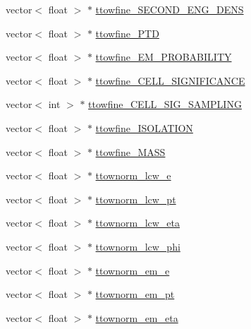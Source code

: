 \begin{DoxyCompactItemize}
\item 
vector$<$ float $>$ $\ast$ \hyperlink{classJetAnalysisExample_ad11605eb068b178cce5c252ad570e131}{ttowfine\+\_\+\+S\+E\+C\+O\+N\+D\+\_\+\+E\+N\+G\+\_\+\+D\+E\+NS}
\item 
vector$<$ float $>$ $\ast$ \hyperlink{classJetAnalysisExample_a8370b79382f319fb16996e94d5d34678}{ttowfine\+\_\+\+P\+TD}
\item 
vector$<$ float $>$ $\ast$ \hyperlink{classJetAnalysisExample_a1db849870dd2c5ee9dbfed083eca334d}{ttowfine\+\_\+\+E\+M\+\_\+\+P\+R\+O\+B\+A\+B\+I\+L\+I\+TY}
\item 
vector$<$ float $>$ $\ast$ \hyperlink{classJetAnalysisExample_ac0b410f6f014e66b5d1b8fde13ca35ad}{ttowfine\+\_\+\+C\+E\+L\+L\+\_\+\+S\+I\+G\+N\+I\+F\+I\+C\+A\+N\+CE}
\item 
vector$<$ int $>$ $\ast$ \hyperlink{classJetAnalysisExample_a26a2e5df09b8b98306636b9b274c9e2f}{ttowfine\+\_\+\+C\+E\+L\+L\+\_\+\+S\+I\+G\+\_\+\+S\+A\+M\+P\+L\+I\+NG}
\item 
vector$<$ float $>$ $\ast$ \hyperlink{classJetAnalysisExample_a0b42178d780176d3aa5cad512428ecc9}{ttowfine\+\_\+\+I\+S\+O\+L\+A\+T\+I\+ON}
\item 
vector$<$ float $>$ $\ast$ \hyperlink{classJetAnalysisExample_adad5fc34d91b35607bbfb822e727947d}{ttowfine\+\_\+\+M\+A\+SS}
\item 
vector$<$ float $>$ $\ast$ \hyperlink{classJetAnalysisExample_adc41a1a50c58b33ff3c35ec2dcac56a5}{ttownorm\+\_\+lcw\+\_\+e}
\item 
vector$<$ float $>$ $\ast$ \hyperlink{classJetAnalysisExample_abe43be214db21d0cf9a04fd10b19b647}{ttownorm\+\_\+lcw\+\_\+pt}
\item 
vector$<$ float $>$ $\ast$ \hyperlink{classJetAnalysisExample_aa9d350b27f0188e07accd09dfafba47b}{ttownorm\+\_\+lcw\+\_\+eta}
\item 
vector$<$ float $>$ $\ast$ \hyperlink{classJetAnalysisExample_a2875f96ce738068d87d95262a838b0ae}{ttownorm\+\_\+lcw\+\_\+phi}
\item 
vector$<$ float $>$ $\ast$ \hyperlink{classJetAnalysisExample_ab387c05df14969295a4211d8f1d689dc}{ttownorm\+\_\+em\+\_\+e}
\item 
vector$<$ float $>$ $\ast$ \hyperlink{classJetAnalysisExample_aaa459ff9c6758609ba3ad6b88699c014}{ttownorm\+\_\+em\+\_\+pt}
\item 
vector$<$ float $>$ $\ast$ \hyperlink{classJetAnalysisExample_a894acba03bb5d334ec2f341709174fad}{ttownorm\+\_\+em\+\_\+eta}
\item 

\end{DoxyCompactItemize}
